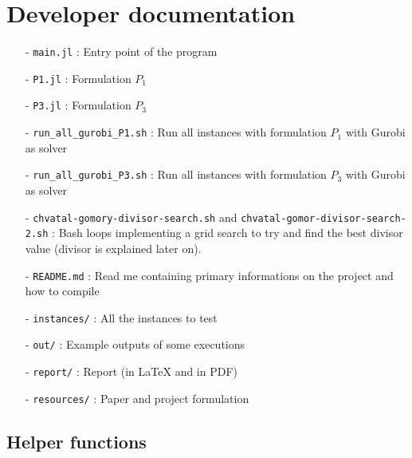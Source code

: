 \documentclass[a4paper,10pt]{article}
\begin{document}
\section{Developer documentation}
\begin{itemize}
    \item[-] \texttt{main.jl} : Entry point of the program
    \item[-] \texttt{P1.jl} : Formulation $P_1$
    \item[-] \texttt{P3.jl} : Formulation $P_3$
    \item[-] \texttt{run\_all\_gurobi\_P1.sh} : Run all instances with formulation $P_1$ with Gurobi as solver 
    \item[-] \texttt{run\_all\_gurobi\_P3.sh} : Run all instances with formulation $P_3$ with Gurobi as solver 
    \item[-] \texttt{chvatal-gomory-divisor-search.sh} and \texttt{chvatal-gomor-divisor-search-2.sh} : Bash loops implementing a grid search to try and find the best divisor value (divisor is explained later on).
    \item[-] \texttt{README.md} : Read me containing primary informations on the project and how to compile
    \item[-] \texttt{instances/} : All the instances to test
    \item[-] \texttt{out/} : Example outputs of some executions
    \item[-] \texttt{report/} : Report (in \LaTeX \; and in PDF)
    \item[-] \texttt{resources/} : Paper and project formulation
    \end{itemize}
    
\subsection{Helper functions} 
\end{document}
